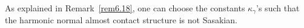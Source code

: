 \documentclass[a4paper,reqno]{amsart}
\newtheorem*{theo}{Theorem}
\theoremstyle{definition}
\theoremstyle{remark}
\theoremstyle{plain}
\numberwithin{equation}{section}
\newcommand{\R}{{\mathbb{R}}}
\newcommand{\bbS}{{\mathbb{S}}}
\newcommand{\g}{{\mathfrak{g}}}  %
\newcommand{\fm}{{\mathfrak{m}}}
\newcommand{\fk}{{\mathfrak{k}}}  \renewcommand{\k}{{\mathfrak{k}}}
\newcommand{\fz}{{\mathfrak{z}}}
\newcommand{\sto}{\twoheadrightarrow}
\def\Lie{\operatorname {Lie}}
\DeclareMathOperator{\Ad}{{Ad}}
\newcommand{\roots}{\mathsf{R}}
\newcommand{\rootsQ}{\mathsf{Q}}
\newcommand{\prootsQ}{\mathsf{Q}^+}
\newcommand{\wK}{{\widetilde{K}}}
\newcommand{\wk}{{\widetilde{\mathfrak{k}}}}
\newcommand{\wz}{{\widetilde{\mathfrak{z}}}}
\newcommand{\wpzero}{{\tilde{p}_0}}
\newcommand{\NACS}{normal almost contact structure\xspace}
\begin{document}
 
As explained in Remark~\ref{rem6.18}, one can choose the constants $\kappa_\gamma$'s such that the harmonic \NACS is not Sasakian.
\end{document}
